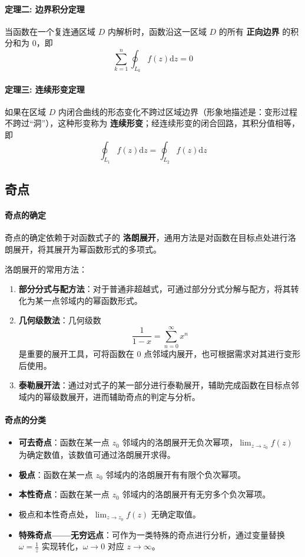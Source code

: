 \documentclass{article}
\begin{document}
	\paragraph{定理二: 边界积分定理}
	当函数在一个复连通区域 $D$ 内解析时，函数沿这一区域 $D$ 的所有 \textbf{正向边界} 的积分和为 0，即
	\[
	\sum_{k=1}^{n}\oint_{L_{k}}f(z)\mathrm{d}z = 0
	\]
	
	\paragraph{定理三: 连续形变定理}
	如果在区域 $D$ 内闭合曲线的形态变化不跨过区域边界（形象地描述是：变形过程不跨过“洞”），这种形变称为 \textbf{连续形变}；经连续形变的闭合回路，其积分值相等，即
	\[
	\oint_{L_1}f(z)\mathrm{d}z=\oint_{L_2}f(z)\mathrm{d}z
	\]
	
	\subsection{奇点}
	\paragraph{奇点的确定}
	奇点的确定依赖于对函数式子的 \textbf{洛朗展开}，通用方法是对函数在目标点处进行洛朗展开，将其展开为幂函数形式的多项式。
	
	洛朗展开的常用方法：
	\begin{enumerate}[label=\arabic*., leftmargin=2em]
		\item \textbf{部分分式与配方法}：对于普通非超越式，可通过部分分式分解与配方，将其转化为某一点邻域内的幂函数形式。
		\item \textbf{几何级数法}：几何级数 
		\[
		\frac{1}{1-x}=\sum_{n=0}^{\infty}x^n
		\]
		是重要的展开工具，可将函数在 $0$ 点邻域内展开，也可根据需求对其进行变形后使用。
		\item \textbf{泰勒展开法}：通过对式子的某一部分进行泰勒展开，辅助完成函数在目标点邻域内的幂级数展开，进而辅助奇点的判定与分析。
	\end{enumerate}
	
	\paragraph{奇点的分类}
	\begin{itemize}[leftmargin=2em, itemsep=0.3em]
		\item \textbf{可去奇点}：函数在某一点 $z_0$ 邻域内的洛朗展开无负次幂项，$\lim_{z \to z_0}f(z)$ 为确定数值，该数值可通过洛朗展开求得。
		\item \textbf{极点}：函数在某一点 $z_0$ 邻域内的洛朗展开有有限个负次幂项。
		\item \textbf{本性奇点}：函数在某一点 $z_0$ 邻域内的洛朗展开有无穷多个负次幂项。
		\item 极点和本性奇点处，$\lim_{z \to z_0}f(z)$ 无确定取值。
		\item \textbf{特殊奇点——无穷远点}：可作为一类特殊的奇点进行分析，通过变量替换 $\omega=\frac{1}{z}$ 实现转化，$\omega\to0$ 对应 $z\to\infty$。
	\end{itemize}
	
\end{document}

